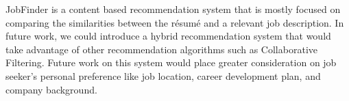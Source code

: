 JobFinder is a content based recommendation system that is mostly focused on comparing the similarities between the r\'esum\'e and a relevant job description. In future work, we could introduce a hybrid recommendation system that would take advantage of other recommendation algorithms such as Collaborative Filtering. Future work on this system would place greater consideration on job seeker's personal preference like job location, career development plan, and company background.
